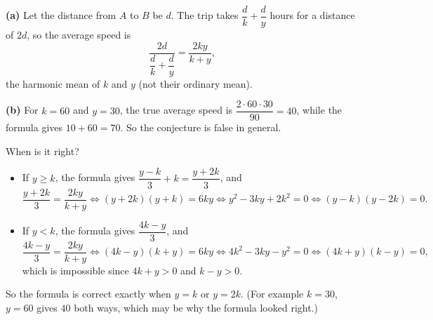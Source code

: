\textbf{(a)} Let the distance from $A$ to $B$ be $d$. The trip takes $\dfrac dk+\dfrac dy$ hours for a distance of $2d$, so the average speed is
\[\dfrac{2d}{\dfrac dk+\dfrac dy}=\boxed{\dfrac{2ky}{k+y}},\]
the harmonic mean of $k$ and $y$ (not their ordinary mean).

\textbf{(b)} For $k=60$ and $y=30$, the true average speed is $\dfrac{2\cdot60\cdot30}{90}=40$, while the formula gives $10+60=70$. So the conjecture is false in general.

When is it right?
\begin{itemize}
\item If $y\ge k$, the formula gives $\dfrac{y-k}{3}+k=\dfrac{y+2k}{3}$, and
\[\dfrac{y+2k}{3}=\dfrac{2ky}{k+y}\iff(y+2k)(y+k)=6ky\iff y^2-3ky+2k^2=0\iff(y-k)(y-2k)=0.\]
\item If $y<k$, the formula gives $\dfrac{4k-y}{3}$, and
\[\dfrac{4k-y}{3}=\dfrac{2ky}{k+y}\iff(4k-y)(k+y)=6ky\iff4k^2-3ky-y^2=0\iff(4k+y)(k-y)=0,\]
which is impossible since $4k+y>0$ and $k-y>0$.
\end{itemize}
So the formula is correct exactly when $\boxed{y=k\text{ or }y=2k}$. (For example $k=30$, $y=60$ gives $40$ both ways, which may be why the formula looked right.)
